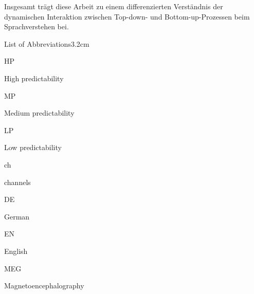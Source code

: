 \documentclass[a4paper, nobind]{templates/ociamthesis}
\begin{document}
\begin{romanpages}
\begin{abstractsecond}
Insgesamt trägt diese Arbeit zu einem differenzierten Verständnis der dynamischen Interaktion zwischen Top-down- und Bottom-up-Prozessen beim Sprachverstehen bei.
\end{abstractsecond}



\flushbottom

\tableofcontents

\listoffigures
	\mtcaddchapter

\listoftables
  \mtcaddchapter
\begin{mclistof}{List of Abbreviations}{3.2cm}

\item[HP]

High predictability

\item[MP]

Medium predictability

\item[LP]

Low predictability

\item[ch]

channels

\item[DE]

German

\item[EN]

English

\item[MEG]

Magnetoencephalography


\end{mclistof}
\end{romanpages}
\end{document}
